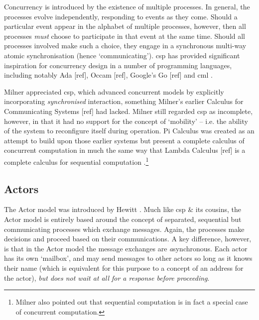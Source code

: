 Concurrency is introduced by the existence of multiple processes.  In general, the processes evolve independently, responding to events as they come.  Should a particular event appear in the alphabet of multiple processes, however, then all processes \emph{must} choose to participate in that event at the same time.  Should all processes involved make such a choice, they engage in a synchronous multi-way atomic synchronisation (hence `communicating').  \gls{csp} has provided significant inspiration for concurrency design in a number of programming languages, including notably Ada [ref], Occam [ref], Google's Go [ref] and \gls{cml} \cite{Reppy2011}.


Milner appreciated \gls{csp}, which advanced concurrent models by explicitly incorporating \emph{synchronised} interaction, something Milner's earlier Calculus for Communicating Systems [ref] had lacked.  Milner still regarded \gls{csp} as incomplete, however, in that it had no support for the concept of `mobility' -- i.e. the ability of the system to reconfigure itself during operation.  Pi Calculus was created as an attempt to build upon those earlier systems but present a complete calculus of concurrent computation in much the same way that Lambda Calculus [ref] is a complete calculus for sequential computation \cite{Milner1993}.\footnote{Milner also pointed out that sequential computation is in fact a special case of concurrent computation.}

\subsection{\label{subsec:actors}Actors}
The Actor model was introduced by Hewitt \cite{Agha1986}.  Much like \gls{csp} \& its cousins, the Actor model is entirely based around the concept of separated, sequential but communicating processes which exchange messages.  Again, the processes make decisions and proceed based on their communications.  A key difference, however, is that in the Actor model the message exchanges are \emph{a}synchronous.  Each actor has its own `mailbox', and may send messages to other actors so long as it knows their name (which is equivalent for this purpose to a concept of an address for the actor), \emph{but does not wait at all for a response before proceeding}.

